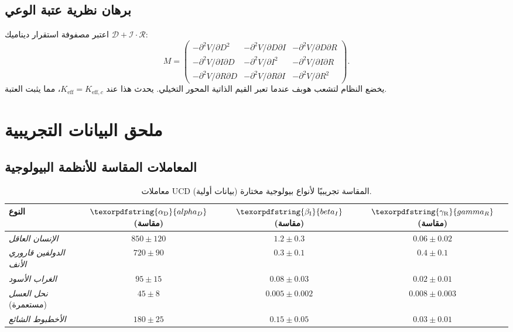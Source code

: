 \documentclass[12pt,a4paper]{article}
\DeclareRobustCommand{\alD}{\texorpdfstring{\ensuremath{\alpha_{\mathrm{D}}}}{alpha_D}}
\DeclareRobustCommand{\beI}{\texorpdfstring{\ensuremath{\beta_{\mathrm{I}}}}{beta_I}}
\DeclareRobustCommand{\gaR}{\texorpdfstring{\ensuremath{\gamma_{\mathrm{R}}}}{gamma_R}}
\newcommand{\eff}{\mathrm{eff}}
\newcommand{\Ke}{K_{\eff}}
\newcommand{\Kec}{K_{\eff,c}}
\begin{document}
	\subsection{برهان نظرية عتبة الوعي}
	
	اعتبر مصفوفة استقرار ديناميك \(\mathcal{D}+\mathcal{I}\cdot\mathcal{R}\):
	\[
	M = \begin{pmatrix}
		-\partial^2 V/\partial D^2 & -\partial^2 V/\partial D\partial I & -\partial^2 V/\partial D\partial R \\
		-\partial^2 V/\partial I\partial D & -\partial^2 V/\partial I^2 & -\partial^2 V/\partial I\partial R \\
		-\partial^2 V/\partial R\partial D & -\partial^2 V/\partial R\partial I & -\partial^2 V/\partial R^2
	\end{pmatrix}.
	\]
	يخضع النظام لتشعب هوبف عندما تعبر القيم الذاتية المحور التخيلي. يحدث هذا عند \(\Ke = \Kec\)، مما يثبت العتبة.
	
	\section{ملحق البيانات التجريبية}
	
	\subsection{المعاملات المقاسة للأنظمة البيولوجية}
	
	\begin{table}[ht]
		\centering
		\begin{tabular}{lccc}
			\toprule
			\textbf{النوع} & \(\alD\) (مقاسة) & \(\beI\) (مقاسة) & \(\gaR\) (مقاسة) \\
			\midrule
			\textit{الإنسان العاقل} & \(850 \pm 120\) & \(1.2 \pm 0.3\) & \(0.06 \pm 0.02\) \\
			\textit{الدولفين قاروري الأنف} & \(720 \pm 90\) & \(0.3 \pm 0.1\) & \(0.4 \pm 0.1\) \\
			\textit{الغراب الأسود} & \(95 \pm 15\) & \(0.08 \pm 0.03\) & \(0.02 \pm 0.01\) \\
			\textit{نحل العسل} (مستعمرة) & \(45 \pm 8\) & \(0.005 \pm 0.002\) & \(0.008 \pm 0.003\) \\
			\textit{الأخطبوط الشائع} & \(180 \pm 25\) & \(0.15 \pm 0.05\) & \(0.03 \pm 0.01\) \\
			\bottomrule
		\end{tabular}
		\caption{معاملات UCD المقاسة تجريبيًا لأنواع بيولوجية مختارة (بيانات أولية).}
		\label{tab:bio-measurements}
	\end{table}
	
\end{document}
